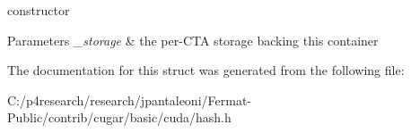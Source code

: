 constructor


\begin{DoxyParams}{Parameters}
{\em \+\_\+storage} & the per-\/\+C\+TA storage backing this container \\
\hline
\end{DoxyParams}


The documentation for this struct was generated from the following file\+:\begin{DoxyCompactItemize}
\item 
C\+:/p4research/research/jpantaleoni/\+Fermat-\/\+Public/contrib/cugar/basic/cuda/hash.\+h\end{DoxyCompactItemize}
